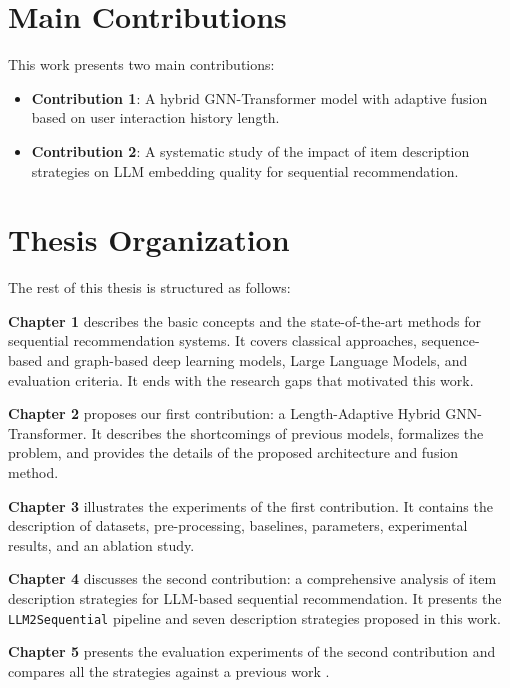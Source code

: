 \documentclass[12pt,a4paper]{report}
\begin{document}
\section*{Main Contributions}

This work presents two main contributions:

\begin{itemize}
  \item \textbf{Contribution 1}: A hybrid GNN-Transformer model with adaptive
  fusion based on user interaction history length.
  \item \textbf{Contribution 2}: A systematic study of the impact of item
  description strategies on LLM embedding quality for sequential
  recommendation.
\end{itemize}

\section*{Thesis Organization}

The rest of this thesis is structured as follows:

\medskip
\textbf{Chapter 1} describes the basic concepts and the state-of-the-art
methods for sequential recommendation systems. It covers classical approaches,
sequence-based and graph-based deep learning models, Large Language Models, and
evaluation criteria. It ends with the research gaps that motivated this work.

\textbf{Chapter 2} proposes our first contribution: a Length-Adaptive Hybrid
GNN-Transformer. It describes the shortcomings of previous models, formalizes
the problem, and provides the details of the proposed architecture and fusion
method.

\textbf{Chapter 3} illustrates the experiments of the first contribution. It
contains the description of datasets, pre-processing, baselines, parameters,
experimental results, and an ablation study.

\textbf{Chapter 4} discusses the second contribution: a comprehensive analysis
of item description strategies for LLM-based sequential recommendation. It
presents the \texttt{LLM2Sequential} pipeline and seven description strategies
proposed in this work.

\textbf{Chapter 5} presents the evaluation experiments of the second
contribution and compares all the strategies against a previous work
\citep{boz2025}.
\end{document}
